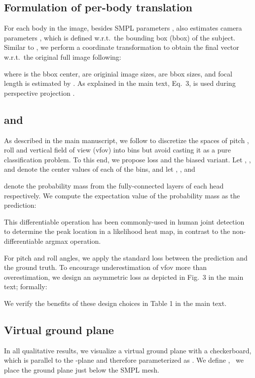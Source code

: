 \documentclass[10pt,twocolumn,letterpaper,usenames,dvipsnames]{article}
\begin{document}
\subsection{Formulation of per-body translation }

For each body in the image, besides SMPL parameters , \methodname also estimates camera parameters , 
which is defined w.r.t.~the bounding box (bbox) of the subject.
Similar to \cite{jiang2020mpshape,kissosECCVW2020}, we perform a coordinate transformation 
to obtain the final  vector w.r.t.~the original full image following: 

where  is the bbox center,  are originial image sizes,  are bbox sizes, and focal length  is estimated by \camcalib.
As explained in the main text, Eq.~3,  is used during perspective projection .

\subsection{\softltwo and \softbiasedltwo}
As described in the main manuscript, we follow \cite{zhu2020single} to discretize the spaces of pitch , roll  and vertical field of view (vfov)  into  bins  but avoid casting it as a pure classification problem.
To this end, we propose \softltwo loss and the biased variant.
Let
,
, and 
 denote the center values of each of the bins, 
and let 
,
, and
 
denote the probability mass from the fully-connected layers of each head respectively.
We compute the expectation value of the probability mass as the prediction:

This differentiable operation has been commonly-used in human joint detection \cite{luvizon2019human,sun2018integral} 
to determine the peak location in a likelihood heat map, in contrast to the non-differentiable argmax operation.

For pitch  and roll  angles, we apply the standard  loss between the prediction and the ground truth. 
To encourage underestimation of vfov  more than overestimation, 
we design an asymmetric loss as depicted in Fig.~3 in the main text; formally:

We verify the benefits of these design choices in Table 1 in the main text.

\subsection{Virtual ground plane}
In all qualitative results, we visualize a virtual ground plane with a checkerboard, 
which is parallel to the -plane and therefore parameterized as .
We define , \ie~we place the ground plane just below the SMPL mesh. 
\end{document}
